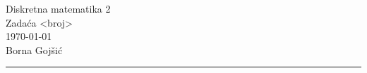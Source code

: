 \documentclass{exam}
\def \brojZadace {<broj>}
\begin{document}
\begingroup
\centering
\LARGE Diskretna matematika 2\\
\Large Zadaća \brojZadace\\
\large \today\\
\large Borna Gojšić\par
\endgroup
\rule{\textwidth}{0.4pt}
\pointsdroppedatright   %
\printanswers
\renewcommand{\solutiontitle}{\noindent\textbf{Rj:}\enspace}   %

\begin{questions}

\question
\begin{parts}
  \part
\end{parts}

\begin{solution}
  \begin{parts}
    \part
  \end{parts}
\end{solution}

\end{questions}
\end{document}
